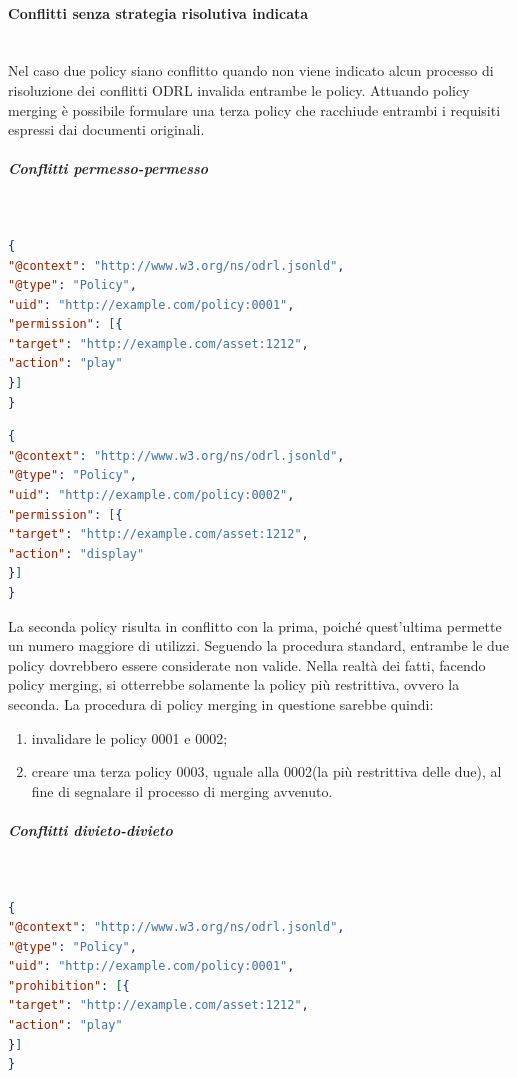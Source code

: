 \documentclass[12pt,a4paper,twoside]{book}
\begin{document}
\paragraph{Conflitti senza strategia risolutiva indicata}\label{noStrat}\mbox{}\\
Nel caso due policy siano conflitto quando non viene indicato alcun processo di risoluzione dei conflitti ODRL invalida entrambe le policy. Attuando policy merging è possibile formulare una terza policy che racchiude entrambi i requisiti espressi dai documenti originali.
\subparagraph{Conflitti permesso-permesso}\label{permperm}\mbox{}\\
\begin{lstlisting}[language=json,firstnumber=1,caption={La policy 0001 permette un qualsiasi utilizzo dell'asset 1212 a chiunque},captionpos=b]
{
"@context": "http://www.w3.org/ns/odrl.jsonld",
"@type": "Policy",
"uid": "http://example.com/policy:0001",
"permission": [{
"target": "http://example.com/asset:1212",
"action": "play"
}]
}
\end{lstlisting}
\begin{lstlisting}[language=json,firstnumber=1,caption={La policy 0002 permette la riproduzione dell'asset 1212 a chiunque},captionpos=b]
{
"@context": "http://www.w3.org/ns/odrl.jsonld",
"@type": "Policy",
"uid": "http://example.com/policy:0002",
"permission": [{
"target": "http://example.com/asset:1212",
"action": "display"
}]
}
\end{lstlisting}
La seconda policy risulta in conflitto con la prima, poiché quest'ultima permette un numero maggiore di utilizzi. Seguendo la procedura standard, entrambe le due policy dovrebbero essere considerate non valide. Nella realtà dei fatti, facendo policy merging, si otterrebbe solamente la policy più restrittiva, ovvero la seconda. La procedura di policy merging in questione sarebbe quindi: 
\begin{enumerate}
	\item invalidare le policy 0001 e 0002;
	\item creare una terza policy 0003, uguale alla 0002(la più restrittiva delle due), al fine di segnalare il processo di merging avvenuto.
\end{enumerate}
\subparagraph{Conflitti divieto-divieto}\label{divdiv}\mbox{}\\
\begin{lstlisting}[language=json,firstnumber=1,caption={La policy 0001 proibisce un qualsiasi utilizzo dell'asset 1212 a chiunque},captionpos=b]
{
"@context": "http://www.w3.org/ns/odrl.jsonld",
"@type": "Policy",
"uid": "http://example.com/policy:0001",
"prohibition": [{
"target": "http://example.com/asset:1212",
"action": "play"
}]
}
\end{lstlisting}
\end{document}
